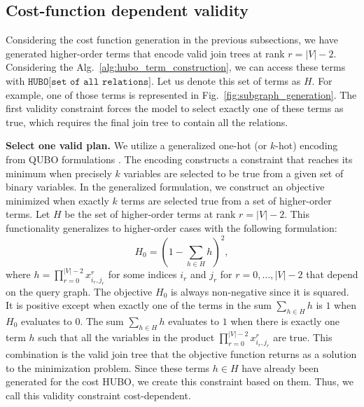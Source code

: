 \subsection{Cost-function dependent validity}\label{subsubsection:cost_function_dependent}

Considering the cost function generation in the previous subsections, we have generated higher-order terms that encode valid join trees at rank $r = |V| - 2$. Considering the Alg.~\ref{alg:hubo_term_construction}, we can access these terms with $\texttt{HUBO[set of all relations]}$. Let us denote this set of terms as $H$. For example, one of those terms is represented in Fig.~\ref{fig:subgraph_generation}. The first validity constraint forces the model to select exactly one of these terms as true, which requires the final join tree to contain all the relations.

\textbf{Select one valid plan.} We utilize a generalized one-hot (or $k$-hot) encoding from QUBO formulations \cite{lucas_2014, Schonberger_Trummer_Mauerer_2023}. The encoding constructs a constraint that reaches its minimum when precisely $k$ variables are selected to be true from a given set of binary variables. In the generalized formulation, we construct an objective minimized when exactly $k$ terms are selected true from a set of higher-order terms. Let $H$ be the set of higher-order terms at rank $r = |V| - 2$. This functionality generalizes to higher-order cases with the following formulation:
\begin{equation}\label{eq:hubo_combinations}
    H_0 = \left( 1 - \sum_{h \in H} h \right)^2,
\end{equation}
where $h = \prod_{r = 0}^{|V| - 2} x_{i_r, j_r}^{r}$ for some indices $i_r$ and $j_r$ for $r = 0, \ldots, |V| - 2$ that depend on the query graph. The objective $H_0$ is always non-negative since it is squared. It is positive except when exactly one of the terms in the sum $\sum_{h \in H} h$ is $1$ when $H_0$ evaluates to $0$. The sum $\sum_{h \in H} h$ evaluates to $1$ when there is exactly one term $h$ such that all the variables in the product $\prod_{r = 0}^{|V| - 2} x_{i_r, j_r}^{r}$ are true. This combination is the valid join tree that the objective function returns as a solution to the minimization problem. Since these terms $h \in H$ have already been generated for the cost HUBO, we create this constraint based on them. Thus, we call this validity constraint cost-dependent.

